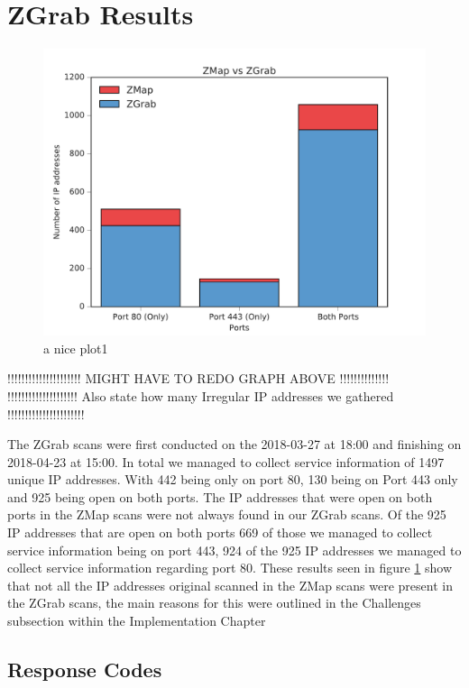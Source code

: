 \documentclass[a4wide,leqno,12pt]{report}
\begin{document}
\section{ZGrab Results}
\begin{figure}[H]
\centering
\includegraphics[scale=.5]{pdf_images/ZMapVsZGrab}
\caption{a nice plot1}
\label{fig:zmap_vs_zgrab}
\end{figure}

!!!!!!!!!!!!!!!!!!!!! MIGHT HAVE TO REDO GRAPH ABOVE !!!!!!!!!!!!!!\\

!!!!!!!!!!!!!!!!!!!! Also state how many Irregular IP addresses we gathered !!!!!!!!!!!!!!!!!!!!!!


The ZGrab scans were first conducted on the 2018-03-27 at 18:00 and finishing on 2018-04-23 at 15:00. In total we managed to collect service information of 1497 unique IP addresses. With 442 being only on port 80, 130 being on Port 443 only and 925 being open on both ports. The IP addresses that were open on both ports in the ZMap scans were not always found in our ZGrab scans. Of the 925 IP addresses that are open on both ports 669 of those we managed to collect service information being on port 443, 924 of the 925 IP addresses we managed to collect service information regarding port 80. These results seen in figure \ref{fig:zmap_vs_zgrab} show that not all the IP addresses original scanned in the ZMap scans were present in the ZGrab scans, the main reasons for this were outlined in the Challenges subsection within the Implementation Chapter  
\subsection{Response Codes}
\end{document}
